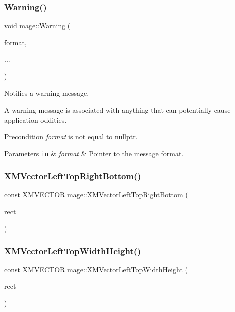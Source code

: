 \subsubsection{\texorpdfstring{Warning()}{Warning()}}
{\footnotesize\ttfamily void mage\+::\+Warning (\begin{DoxyParamCaption}\item[{const char $\ast$}]{format,  }\item[{}]{... }\end{DoxyParamCaption})}

Notifies a warning message.

A warning message is associated with anything that can potentially cause application oddities.

\begin{DoxyPrecond}{Precondition}
{\itshape format} is not equal to {\ttfamily nullptr}. 
\end{DoxyPrecond}

\begin{DoxyParams}[1]{Parameters}
\mbox{\tt in}  & {\em format} & Pointer to the message format. \\
\hline
\end{DoxyParams}
\hypertarget{namespacemage_aa049ddf42f2937d6bc7f730f4eabf57a}{}\label{namespacemage_aa049ddf42f2937d6bc7f730f4eabf57a} 
\subsubsection{\texorpdfstring{X\+M\+Vector\+Left\+Top\+Right\+Bottom()}{XMVectorLeftTopRightBottom()}}
{\footnotesize\ttfamily const X\+M\+V\+E\+C\+T\+OR mage\+::\+X\+M\+Vector\+Left\+Top\+Right\+Bottom (\begin{DoxyParamCaption}\item[{const R\+E\+CT \&}]{rect }\end{DoxyParamCaption})}

\hypertarget{namespacemage_a21b11fa85a84f903e3bd4678bf655270}{}\label{namespacemage_a21b11fa85a84f903e3bd4678bf655270} 
\subsubsection{\texorpdfstring{X\+M\+Vector\+Left\+Top\+Width\+Height()}{XMVectorLeftTopWidthHeight()}}
{\footnotesize\ttfamily const X\+M\+V\+E\+C\+T\+OR mage\+::\+X\+M\+Vector\+Left\+Top\+Width\+Height (\begin{DoxyParamCaption}\item[{const R\+E\+CT \&}]{rect }\end{DoxyParamCaption})}



